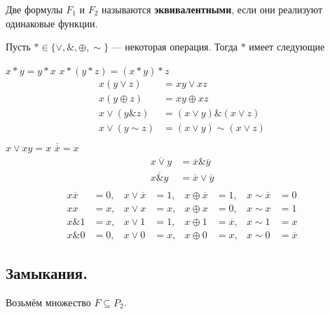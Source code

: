 \begin{df}
	Две формулы $F_1$ и $F_2$ называются {\bf эквивалентными},
	если они реализуют одинаковые функции.
\end{df}

Пусть $\ast \in \{\vee, \&, \oplus, \sim \}$ --- некоторая операция. Тогда $\ast$ имеет следующие

\begin{props}
		$x \ast y = y \ast x$
		$x \ast (y \ast z) = (x \ast y) \ast z$
		\begin{align*}
			x (y \vee z) &= xy \vee xz \\
			x (y \oplus z) &= xy \oplus xz \\
			x \vee (y  \&  z) &= (x \vee y) \& (x \vee z) \\
			x \vee (y  \sim  z) &= (x \vee y) \sim (x \vee z) \\
		\end{align*}
		$x \vee xy = x$
		$\overline{\overline{x}} = x$
		\begin{align*}
			\overline{x \vee y} &= \overline{x} \& \overline{y} \\
			\overline{x \& y} &= \overline{x} \vee \overline{y} \\ 
		\end{align*}
	\prpy{}
		\begin{align*} 
			x\overline{x} &= 0, & x \vee \overline{x} &= 1, & x \oplus \overline{x} &= 1, & x \sim \overline{x} &= 0 \\
			xx &= x, & x \vee x &= x, & x \oplus x &= 0, & x \sim x &= 1 \\
			x \& 1 &= x, & x \vee 1 &= 1, & x \oplus 1 &= \overline{x}, & x \sim 1 &= x \\
			x \& 0 &= 0, & x \vee 0 &= x, & x \oplus 0 &= x, & x \sim 0 &= \overline{x}
		\end{align*}
\end{props}


\subsection{Замыкания.}

Возьмём множество $F \subseteq P_2$.

